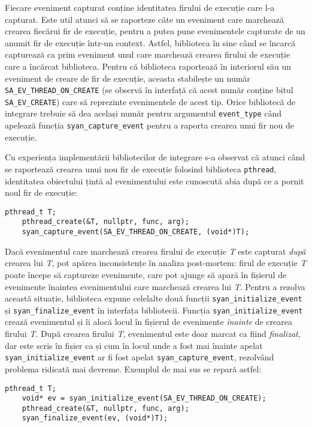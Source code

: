 Fiecare eveniment capturat conține identitatea firului de execuție care
l-a capturat. Este util atunci să se raporteze câte un eveniment care
marchează crearea fiecărui fir de execuție, pentru a putea pune
evenimentele capturate de un anumit fir de execuție într-un context.
Astfel, biblioteca în sine când se încarcă capturează ca prim eveniment
unul care marchează crearea firului de execuție care a încărcat
biblioteca. Pentru că biblioteca raportează în interiorul său un
eveniment de creare de fir de execuție, aceasta stabilește un număr
\lstinline{SA_EV_THREAD_ON_CREATE} (se observă în interfață că acest
număr conține bitul \lstinline{SA_EV_CREATE}) care să reprezinte
evenimentele de acest tip. Orice bibliotecă de integrare trebuie să dea
același număr pentru argumentul \lstinline{event_type} când apelează
funcția \lstinline{syan_capture_event} pentru a raporta crearea unui fir
nou de execuție.

Cu experiența implementării bibliotecilor de integrare s-a observat că
atunci când se raportează crearea unui nou fir de execuție folosind
biblioteca \lstinline{pthread}, identitatea obiectului țintă
al evenimentului este cunoscută abia după ce a pornit noul fir de
execuție:
\begin{lstlisting}[caption=Capturare incorectă a creării unui fir de
                           execuție]
    pthread_t T;
    pthread_create(&T, nullptr, func, arg);
    syan_capture_event(SA_EV_THREAD_ON_CREATE, (void*)T);
\end{lstlisting}
Dacă evenimentul care marchează crearea firului de execuție \textit{T}
este capturat \textit{după} crearea lui \textit{T}, pot apărea
inconsistențe în analiza post-mortem: firul de execuție \textit{T} poate
începe să captureze evenimente, care pot ajunge să apară în fișierul de
evenimente înaintea evenimentului care marchează crearea lui \textit{T}.
Pentru a rezolva această situație, biblioteca expune celelalte două
funcții \lstinline{syan_initialize_event} și
\lstinline{syan_finalize_event} în interfața bibliotecii.  Funcția
\lstinline{syan_initialize_event} crează evenimentul și îi alocă locul
în fișierul de evenimente \textit{înainte} de crearea firului
\textit{T}. După crearea firului \textit{T}, evenimentul este doar
marcat ca fiind \textit{finalizat}, dar este scris în fișier ca și cum
în locul unde a fost mai înainte apelat
\lstinline{syan_initialize_event} ar fi fost apelat
\lstinline{syan_capture_event}, rezolvând problema ridicată mai devreme.
Exemplul de mai sus se repară astfel:
\begin{lstlisting}[caption=Capturare corectă a creerii unui fir de
                           execuție]
    pthread_t T;
    void* ev = syan_initialize_event(SA_EV_THREAD_ON_CREATE);
    pthread_create(&T, nullptr, func, arg);
    syan_finalize_event(ev, (void*)T);
\end{lstlisting}

